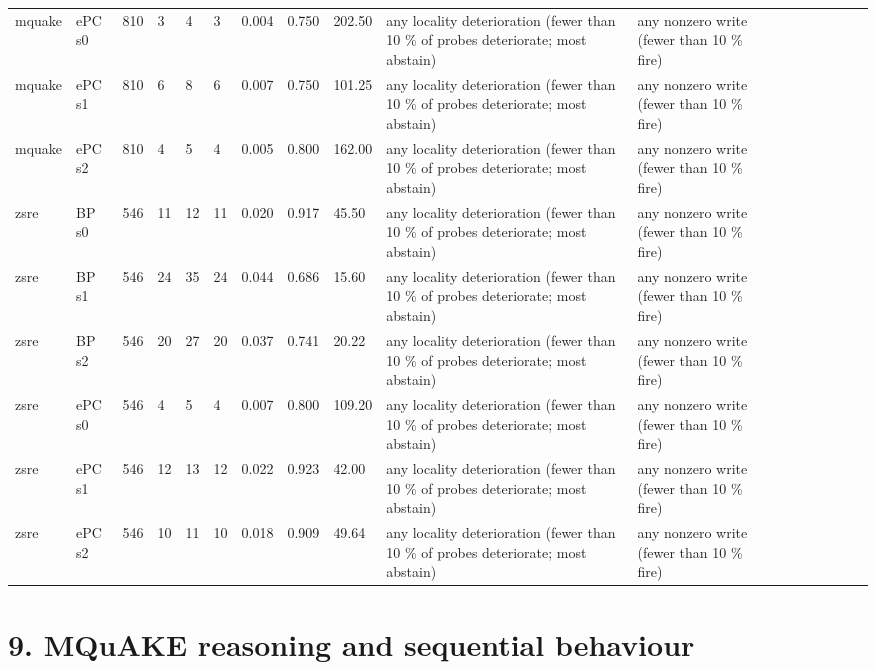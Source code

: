 \documentclass[10pt,a4paper]{article}
\begin{document}
\begin{center}
\begin{tabularx}{\textwidth}{@{}p{}XXXXXXXXXXXXXXXXX@{}}
mquake & ePC s0 & 810 & 3 & 4 & 3 & 0.004 & 0.750 & 202.50 & any locality deterioration (fewer than 10 \% of probes deteriorate; most abstain) & any nonzero write (fewer than 10 \% fire) &  &  &  &  &  &  &  \\
mquake & ePC s1 & 810 & 6 & 8 & 6 & 0.007 & 0.750 & 101.25 & any locality deterioration (fewer than 10 \% of probes deteriorate; most abstain) & any nonzero write (fewer than 10 \% fire) &  &  &  &  &  &  &  \\
mquake & ePC s2 & 810 & 4 & 5 & 4 & 0.005 & 0.800 & 162.00 & any locality deterioration (fewer than 10 \% of probes deteriorate; most abstain) & any nonzero write (fewer than 10 \% fire) &  &  &  &  &  &  &  \\
zsre & BP s0 & 546 & 11 & 12 & 11 & 0.020 & 0.917 & 45.50 & any locality deterioration (fewer than 10 \% of probes deteriorate; most abstain) & any nonzero write (fewer than 10 \% fire) &  &  &  &  &  &  &  \\
zsre & BP s1 & 546 & 24 & 35 & 24 & 0.044 & 0.686 & 15.60 & any locality deterioration (fewer than 10 \% of probes deteriorate; most abstain) & any nonzero write (fewer than 10 \% fire) &  &  &  &  &  &  &  \\
zsre & BP s2 & 546 & 20 & 27 & 20 & 0.037 & 0.741 & 20.22 & any locality deterioration (fewer than 10 \% of probes deteriorate; most abstain) & any nonzero write (fewer than 10 \% fire) &  &  &  &  &  &  &  \\
zsre & ePC s0 & 546 & 4 & 5 & 4 & 0.007 & 0.800 & 109.20 & any locality deterioration (fewer than 10 \% of probes deteriorate; most abstain) & any nonzero write (fewer than 10 \% fire) &  &  &  &  &  &  &  \\
zsre & ePC s1 & 546 & 12 & 13 & 12 & 0.022 & 0.923 & 42.00 & any locality deterioration (fewer than 10 \% of probes deteriorate; most abstain) & any nonzero write (fewer than 10 \% fire) &  &  &  &  &  &  &  \\
zsre & ePC s2 & 546 & 10 & 11 & 10 & 0.018 & 0.909 & 49.64 & any locality deterioration (fewer than 10 \% of probes deteriorate; most abstain) & any nonzero write (fewer than 10 \% fire) &  &  &  &  &  &  &  \\
\bottomrule
\end{tabularx}
\end{center}



\section*{9. MQuAKE reasoning and sequential behaviour}
\end{document}
